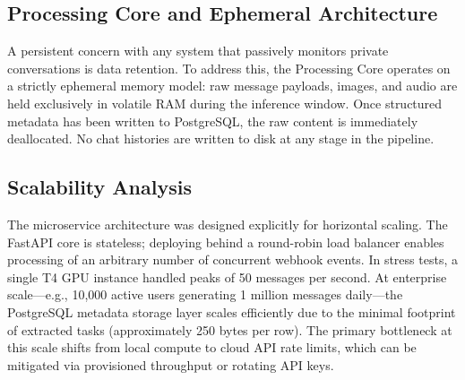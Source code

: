 \subsection{Processing Core and Ephemeral Architecture}
A persistent concern with any system that passively monitors private conversations is data retention. To address this, the Processing Core operates on a strictly ephemeral memory model: raw message payloads, images, and audio are held exclusively in volatile RAM during the inference window. Once structured metadata has been written to PostgreSQL, the raw content is immediately deallocated. No chat histories are written to disk at any stage in the pipeline.

\subsection{Scalability Analysis}
The microservice architecture was designed explicitly for horizontal scaling. The FastAPI core is stateless; deploying behind a round-robin load balancer enables processing of an arbitrary number of concurrent webhook events. In stress tests, a single T4 GPU instance handled peaks of 50 messages per second. At enterprise scale—e.g., 10,000 active users generating 1 million messages daily—the PostgreSQL metadata storage layer scales efficiently due to the minimal footprint of extracted tasks (approximately 250 bytes per row). The primary bottleneck at this scale shifts from local compute to cloud API rate limits, which can be mitigated via provisioned throughput or rotating API keys.
